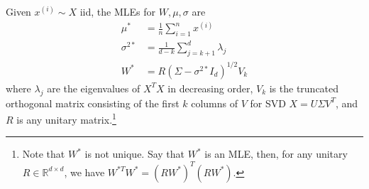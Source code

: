   \begin{theorem}
    Given $x^{(i)} \sim X$ iid, the MLEs for $W, \mu, \sigma$ are 
    \begin{align}
      \mu^\ast & = \frac{1}{n} \sum_{i=1}^n x^{(i)} \\
      \sigma^{2 \ast} & = \frac{1}{d-k} \sum_{j=k+1}^d \lambda_j \\
      W^\ast & = R (\Sigma - \sigma^{2 \ast} I_d )^{1/2} V_k
    \end{align}
    where $\lambda_j$ are the eigenvalues of $X^T X$ in decreasing order, $V_k$ is the truncated orthogonal matrix consisting of the first $k$ columns of $V$ for SVD $X = U \Sigma V^T$, and $R$ is any unitary matrix.\footnote{Note that $W^{\ast}$ is not unique. Say that $W^\ast$ is an MLE, then, for any unitary $R \in \mathbb{R}^{d \times d}$, we have $W^{\ast T} W^\ast = (R W^\ast)^T (R W^\ast)$.} 
  \end{theorem}
